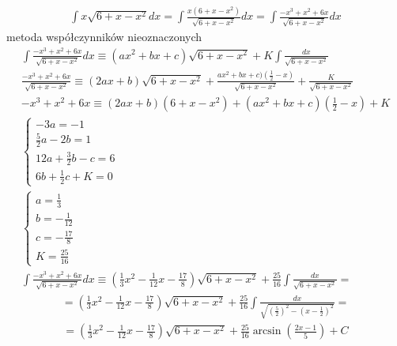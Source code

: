 \begin{gather*}\int x\sqrt{6+x-x^2}dx = \int \frac{x(6+x-x^2)}{\sqrt{6+x-x^2}}dx = \int \frac{-x^3+x^2+6x}{\sqrt{6+x-x^2}}dx\end{gather*}
metoda współczynników nieoznaczonych
\begin{gather*}\int \frac{-x^3+x^2+6x}{\sqrt{6+x-x^2}}dx \equiv (ax^2+bx+c)\sqrt{6+x-x^2} + K\int \frac{dx}{\sqrt{6+x-x^2}} \\
\frac{-x^3+x^2+6x}{\sqrt{6+x-x^2}} \equiv (2ax+b)\sqrt{6+x-x^2}+\frac{ax^2+bx+c)(\frac{1}{2}-x)}{\sqrt{6+x-x^2}} + \frac{K}{\sqrt{6+x-x^2}} \\
-x^3+x^2+6x \equiv (2ax+b)(6+x-x^2)+(ax^2+bx+c)(\frac{1}{2}-x)+K \\
\begin{cases} -3a=-1 \\ \frac{5}{2}a-2b=1 \\ 12a+\frac{3}{2}b-c=6 \\ 6b+\frac{1}{2}c+K=0 \end{cases} \\
\begin{cases} a=\frac{1}{3} \\ b=-\frac{1}{12} \\ c=-\frac{17}{8} \\ K=\frac{25}{16} \end{cases} \\
\int \frac{-x^3+x^2+6x}{\sqrt{6+x-x^2}}dx \equiv (\frac{1}{3}x^2-\frac{1}{12}x-\frac{17}{8})\sqrt{6+x-x^2} + \frac{25}{16}\int \frac{dx}{\sqrt{6+x-x^2}} = \end{gather*}
\begin{gather*}= (\frac{1}{3}x^2-\frac{1}{12}x-\frac{17}{8})\sqrt{6+x-x^2} + \frac{25}{16}\int \frac{dx}{\sqrt{(\frac{5}{2})^2-(x-\frac{1}{2})^2}} = \end{gather*}
\begin{gather*}= (\frac{1}{3}x^2-\frac{1}{12}x-\frac{17}{8})\sqrt{6+x-x^2} + \frac{25}{16}\arcsin \left(\frac{2x-1}{5}\right)+C\end{gather*}



